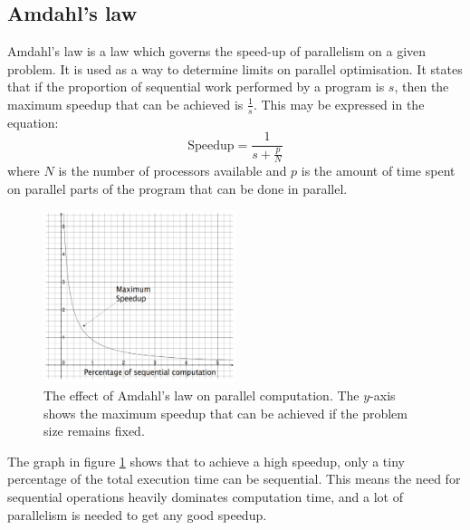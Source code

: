 \documentclass[CS4204-Notes.tex]{subfiles}
\begin{document}
\subsection{Amdahl's law}
Amdahl's law is a law which governs the speed-up of parallelism on a given problem. It is used as a way to determine limits on parallel optimisation. It states that if the proportion of sequential work performed by a program is $s$, then the maximum speedup that can be achieved is $\frac{1}{s}$. This may be expressed in the equation:
\begin{equation}
\text{Speedup} = \frac{1}{s + \frac{p}{N}}
\end{equation}
where $N$ is the number of processors available and $p$ is the amount of time spent on parallel parts of the program that can be done in parallel. 
\begin{figure}[H]
\centering
\includegraphics[width=0.5\textwidth, keepaspectratio]{imgs/amdahls-law.png}
\caption{The effect of Amdahl's law on parallel computation. The $y$-axis shows the maximum speedup that can be achieved if the problem size remains fixed.}
\label{fig:amdals-law}
\end{figure}
\noindent
The graph in figure \ref{fig:amdals-law} shows that to achieve a high speedup, only a tiny percentage of the total execution time can be sequential. This means the need for sequential operations heavily dominates computation time, and a lot of parallelism is needed to get any good speedup. 
\end{document}
